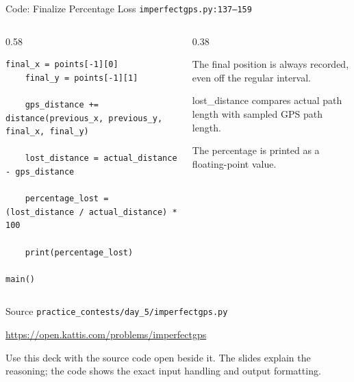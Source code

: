 \documentclass[aspectratio=169,11pt]{beamer}
\begin{document}
\begin{frame}[fragile]{Code: Finalize Percentage Loss}
\scriptsize
{} \texttt{imperfectgps.py:137--159}

\vspace{0.08cm}
\begin{columns}[T,totalwidth=\textwidth]
\begin{column}{0.58\textwidth}
\begin{lstlisting}[style=cpcode]
    final_x = points[-1][0]
    final_y = points[-1][1]

    gps_distance += distance(previous_x, previous_y, final_x, final_y)

    lost_distance = actual_distance - gps_distance

    percentage_lost = (lost_distance / actual_distance) * 100

    print(percentage_lost)

main()
\end{lstlisting}
\end{column}
\begin{column}{0.38\textwidth}
\begin{tightitemize}
  \item The final position is always recorded, even off the regular interval.
  \item lost\_distance compares actual path length with sampled GPS path length.
  \item The percentage is printed as a floating-point value.
\end{tightitemize}
\end{column}
\end{columns}
\end{frame}

\begin{frame}{Source}
\small
{} \texttt{practice\_contests/day\_5/imperfectgps.py}

\vspace{0.3cm}
 \url{https://open.kattis.com/problems/imperfectgps}

\vspace{0.45cm}
Use this deck with the source code open beside it. The slides explain the reasoning; the code shows the exact input handling and output formatting.
\end{frame}
\end{document}
